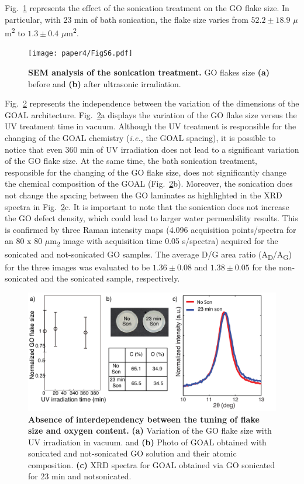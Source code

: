 Fig.~\ref{figS6_AppC} represents the effect of the sonication treatment on the GO flake size. In particular,
with 23 min of bath sonication, the flake size varies from $52.2\pm18.9$ $\mu$m\textsuperscript{2} to $1.3\pm0.4$ $\mu$m\textsuperscript{2}.

\begin{figure}[h!]
  \centering
  \texttt{[image: paper4/FigS6.pdf]}
  \caption{\textbf{SEM analysis of the sonication treatment.}  GO flakes size \textbf{(a)} before and \textbf{(b)} after ultrasonic irradiation.} 
  \label{figS6_AppC}
\end{figure}

Fig.~\ref{figS7_AppC} represents the independence between the variation of the dimensions of the GOAL architecture. Fig.~\ref{figS7_AppC}a displays the variation of the GO flake size versus the UV treatment time in vacuum. Although the UV treatment is responsible for the changing of the GOAL chemistry (\textit{i.e.}, the GOAL spacing), it is possible to notice that even 360 min of UV irradiation does not lead to a significant variation of the GO flake size. At the same time, the bath sonication treatment, responsible for the changing of the GO flake size, does not significantly change the chemical composition of the GOAL (Fig.~\ref{figS7_AppC}b). Moreover, the sonication does not change the spacing between the GO laminates as highlighted in the XRD spectra in Fig.~\ref{figS7_AppC}c. It is important to note that the sonication does not increase the GO defect density, which could lead to larger water permeability results. This is confirmed by three Raman intensity maps (4.096 acquisition points/spectra for an 80 x 80 $\mu$m\textsubscript{2} image with acquisition time 0.05 s/spectra) acquired for the sonicated and not-sonicated GO samples. The average D/G area ratio (A\textsubscript{D}/A\textsubscript{G}) for the three
images was evaluated to be $1.36\pm0.08$ and $1.38\pm0.05$ for the non-sonicated and the sonicated sample, respectively. 

\begin{figure}[h!]
  \centering
  \includegraphics[width=5.5in]{paper4/FigS7.pdf}
  \caption{\textbf{Absence of interdependency between the tuning of flake size and oxygen content.} \textbf{(a)} Variation of the GO flake size with UV irradiation in vacuum. and \textbf{(b)} Photo of GOAL obtained with sonicated and not-sonicated GO solution and their atomic composition. \textbf{(c)} XRD spectra for GOAL obtained via GO sonicated for 23 min and notsonicated.} 
  \label{figS7_AppC}
\end{figure}

